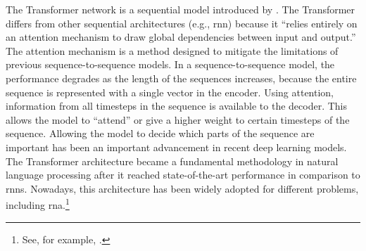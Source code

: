 

The Transformer network is a sequential model introduced by
\textcite{vaswani2017attention}. The Transformer differs
from other sequential architectures (e.g., \gls{rnn})
because it ``relies entirely on an attention mechanism to
draw global dependencies between input and output.'' The
attention mechanism is a method designed to mitigate the
limitations of previous sequence-to-sequence models. In a
sequence-to-sequence model, the performance degrades as the
length of the sequences increases, because the entire
sequence is represented with a single vector in the encoder.
Using attention, information from all timesteps in the
sequence is available to the decoder. This allows the model
to ``attend'' or give a higher weight to certain timesteps
of the sequence. Allowing the model to decide which parts of
the sequence are important has been an important advancement
in recent deep learning models. The Transformer architecture
became a fundamental methodology in natural language
processing after it reached state-of-the-art performance in
comparison to \glspl{rnn}. Nowadays, this architecture has
been widely adopted for different problems, including
\gls{rna}.\footnote{See, for example,
\textcite{chen2021attend}.}
